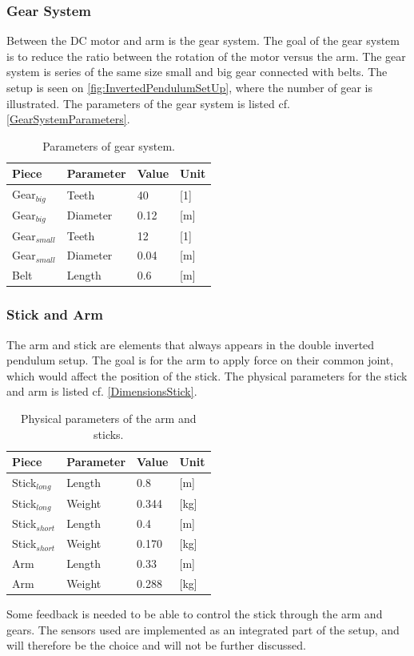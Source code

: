 	

\subsubsection{Gear System}
Between the DC motor and arm is the gear system. The goal of the gear system is to reduce the ratio between the rotation of the motor versus the arm. The gear system is series of the same size small and big gear connected with belts. The setup is seen on \autoref{fig:InvertedPendulumSetUp}, where the number of gear is illustrated. The parameters of the gear system is listed cf. \autoref{GearSystemParameters}. 

\begin{table}[htbp]
\centering
\caption{Parameters of gear system.}
\label{GearSystemParameters}
\begin{tabular}{llll}
\hline
Piece & Parameter & Value & Unit \\ \hline
Gear$_{big}$ & Teeth & 40 & {[}1{]} \\
Gear$_{big}$ & Diameter & 0.12 & {[}m{]} \\
Gear$_{small}$ & Teeth & 12 & {[}1{]} \\
Gear$_{small}$ & Diameter & 0.04 & {[}m{]} \\
Belt & Length & 0.6 & {[}m{]}
\end{tabular}
\end{table}

\subsubsection{Stick and Arm}
The arm and stick are elements that always appears in the double inverted pendulum setup. The goal is for the arm to apply force on their common joint, which would affect the position of the stick. The physical parameters for the stick and arm is listed cf. \autoref{DimensionsStick}.

\begin{table}[htbp]
\centering
\caption{Physical parameters of the arm and sticks.}
\label{DimensionsStick}
\begin{tabular}{llll}
\hline
Piece           & Parameter & Value & Unit \\ \hline
Stick$_{long}$  & Length    & 0.8   & [m]    \\
Stick$_{long}$  & Weight    & 0.344 & [kg]    \\ 
Stick$_{short}$ & Length    & 0.4   & [m]    \\
Stick$_{short}$ & Weight    & 0.170 & [kg]    \\ 
Arm             & Length    & 0.33  & [m]    \\
Arm             & Weight    & 0.288   & [kg]   \\ 
\end{tabular}
\end{table}
\newpage
Some feedback is needed to be able to control the stick through the arm and gears. The sensors used are implemented as an integrated part of the setup, and will therefore be the choice and will not be further discussed.

